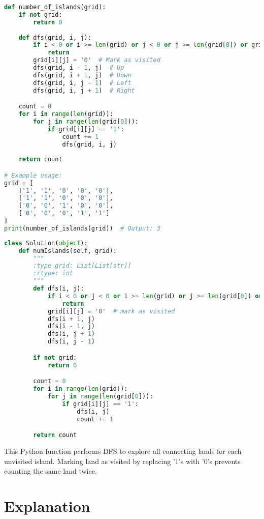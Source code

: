 \begin{fullwidth}
\begin{lstlisting}[language=Python]
def number_of_islands(grid):
    if not grid:
        return 0
    
    def dfs(grid, i, j):
        if i < 0 or i >= len(grid) or j < 0 or j >= len(grid[0]) or grid[i][j] == '0':
            return
        grid[i][j] = '0'  # Mark as visited
        dfs(grid, i - 1, j)  # Up
        dfs(grid, i + 1, j)  # Down
        dfs(grid, i, j - 1)  # Left
        dfs(grid, i, j + 1)  # Right

    count = 0
    for i in range(len(grid)):
        for j in range(len(grid[0])):
            if grid[i][j] == '1':
                count += 1
                dfs(grid, i, j)
    
    return count

# Example usage:
grid = [
    ['1', '1', '0', '0', '0'],
    ['1', '1', '0', '0', '0'],
    ['0', '0', '1', '0', '0'],
    ['0', '0', '0', '1', '1']
]
print(number_of_islands(grid))  # Output: 3
\end{lstlisting}
\end{fullwidth}
\begin{fullwidth}
\begin{lstlisting}[language=Python]
class Solution(object):
    def numIslands(self, grid):
        """
        :type grid: List[List[str]]
        :rtype: int
        """
        def dfs(i, j):
            if i < 0 or j < 0 or i >= len(grid) or j >= len(grid[0]) or grid[i][j] == '0':
                return
            grid[i][j] = '0'  # mark as visited
            dfs(i + 1, j)
            dfs(i - 1, j)
            dfs(i, j + 1)
            dfs(i, j - 1)

        if not grid:
            return 0

        count = 0
        for i in range(len(grid)):
            for j in range(len(grid[0])):
                if grid[i][j] == '1':
                    dfs(i, j)
                    count += 1

        return count
\end{lstlisting}
\end{fullwidth}
    
This Python function performs DFS to explore all connecting lands for each unvisited island. Marking land as visited by replacing '1's with '0's prevents counting the same land twice.
    
\section*{Explanation}
    
